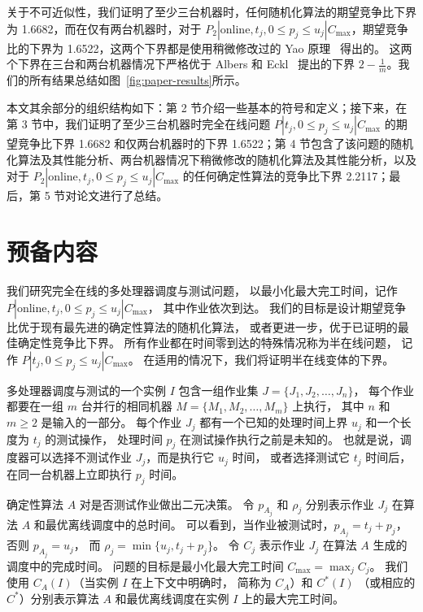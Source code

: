关于不可近似性，我们证明了至少三台机器时，任何随机化算法的期望竞争比下界为 1.6682，而在仅有两台机器时，对于 \( P_2 | \text{online}, t_j, 0 \leq p_j \leq u_j | C_{\text{max}} \)，期望竞争比的下界为 1.6522，这两个下界都是使用稍微修改过的 Yao 原理~\cite{yao1977probabilistic} 得出的。
这两个下界在三台和两台机器情况下严格优于 Albers 和 Eckl~\cite{albers2021scheduling} 提出的下界 \( 2 - \frac{1}{m} \)。我们的所有结果总结如图~\ref{fig:paper-results}所示。

本文其余部分的组织结构如下：第 2 节介绍一些基本的符号和定义；接下来，在第 3 节中，我们证明了至少三台机器时完全在线问题 \( P | t_j, 0 \leq p_j \leq u_j | C_{\text{max}} \) 的期望竞争比下界 1.6682 和仅两台机器时的下界 1.6522；第 4 节包含了该问题的随机化算法及其性能分析、两台机器情况下稍微修改的随机化算法及其性能分析，以及对于 \( P_2 | \text{online}, t_j, 0 \leq p_j \leq u_j | C_{\text{max}} \) 的任何确定性算法的竞争比下界 2.2117；最后，第 5 节对论文进行了总结。

\section{预备内容}

我们研究完全在线的多处理器调度与测试问题，
以最小化最大完工时间，记作
\( P | \text{online}, t_j, 0 \leq p_j \leq u_j | C_{\text{max}} \)，
其中作业依次到达。
我们的目标是设计期望竞争比优于现有最先进的确定性算法的随机化算法，
或者更进一步，优于已证明的最佳确定性竞争比下界。
所有作业都在时间零到达的特殊情况称为半在线问题，
记作 \( P | t_j , 0 \leq p_j \leq u_j | C_{\text{max}} \)。
在适用的情况下，我们将证明半在线变体的下界。

多处理器调度与测试的一个实例 \( I \) 
包含一组作业集 \( J = \{J_1, J_2, \dots, J_n\} \)，
每个作业都要在一组 \( m \) 台并行的相同机器 
\( M = \{M_1, M_2, \dots, M_m\} \) 上执行，
其中 \( n \) 和 \( m \geq 2 \) 是输入的一部分。
每个作业 \( J_j \) 都有一个已知的处理时间上界 \( u_j \) 
和一个长度为 \( t_j \) 的测试操作，
处理时间 \( p_j \) 在测试操作执行之前是未知的。
也就是说，调度器可以选择不测试作业 \( J_j \)，而是执行它 \( u_j \) 时间，
或者选择测试它 \( t_j \) 时间后，在同一台机器上立即执行 \( p_j \) 时间。

确定性算法 \( A \) 对是否测试作业做出二元决策。
令 \( p_{A_j} \) 和 \( \rho_j \) 
分别表示作业 \( J_j \) 在算法 \( A \) 和最优离线调度中的总时间。
可以看到，当作业被测试时，\( p_{A_j} = t_j + p_j \)，
否则 \( p_{A_j} = u_j \)，
而 \( \rho_j = \min\{u_j, t_j + p_j\} \)。
令 \( C_j \) 表示作业 \( J_j \) 在算法 \( A \) 生成的调度中的完成时间。
问题的目标是最小化最大完工时间 \( C_{\text{max}} = \max_j C_j \)。
我们使用 \( C_A(I) \)（当实例 \( I \) 在上下文中明确时，
简称为 \( C_A \)）和 \( C^*(I) \)
（或相应的 \( C^* \)）分别表示算法 \( A \) 和最优离线调度在实例 \( I \) 上的最大完工时间。


